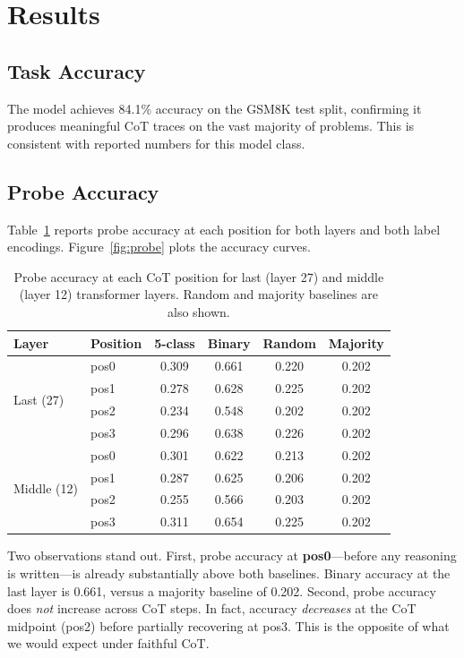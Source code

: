 \documentclass[11pt]{article}
\begin{document}
\section{Results}

\subsection{Task Accuracy}

The model achieves 84.1\% accuracy on the GSM8K test split, confirming it produces meaningful CoT traces on the vast majority of problems. This is consistent with reported numbers for this model class.

\subsection{Probe Accuracy}

Table~\ref{tab:probe} reports probe accuracy at each position for both layers and both label encodings. Figure~\ref{fig:probe} plots the accuracy curves.

\begin{table}[t]
\centering
\small
\begin{tabular}{llcccc}
\toprule
\textbf{Layer} & \textbf{Position} & \textbf{5-class} & \textbf{Binary} & \textbf{Random} & \textbf{Majority} \\
\midrule
\multirow{4}{*}{Last (27)}
  & pos0 & 0.309 & 0.661 & 0.220 & 0.202 \\
  & pos1 & 0.278 & 0.628 & 0.225 & 0.202 \\
  & pos2 & 0.234 & 0.548 & 0.202 & 0.202 \\
  & pos3 & 0.296 & 0.638 & 0.226 & 0.202 \\
\midrule
\multirow{4}{*}{Middle (12)}
  & pos0 & 0.301 & 0.622 & 0.213 & 0.202 \\
  & pos1 & 0.287 & 0.625 & 0.206 & 0.202 \\
  & pos2 & 0.255 & 0.566 & 0.203 & 0.202 \\
  & pos3 & 0.311 & 0.654 & 0.225 & 0.202 \\
\bottomrule
\end{tabular}
\caption{Probe accuracy at each CoT position for last (layer 27) and middle (layer 12) transformer layers. Random and majority baselines are also shown.}
\label{tab:probe}
\end{table}

Two observations stand out. First, probe accuracy at \textbf{pos0}—before any reasoning is written—is already substantially above both baselines. Binary accuracy at the last layer is 0.661, versus a majority baseline of 0.202. Second, probe accuracy does \textit{not} increase across CoT steps. In fact, accuracy \textit{decreases} at the CoT midpoint (pos2) before partially recovering at pos3. This is the opposite of what we would expect under faithful CoT.
\end{document}
